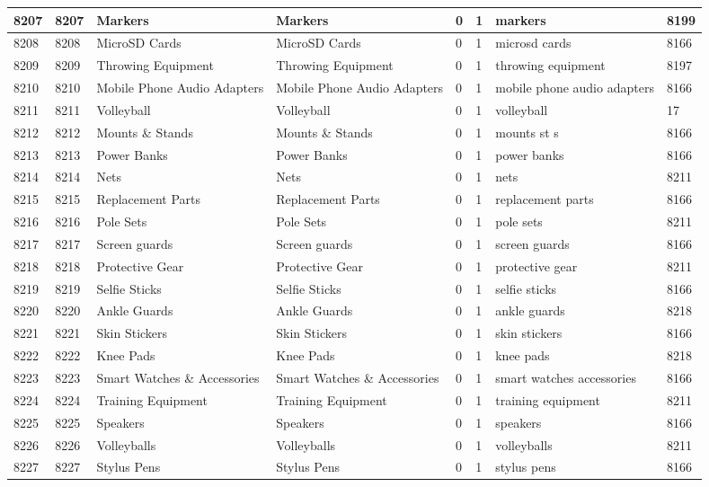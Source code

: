 \begin{longtable}{|l|l|l|l|l|l|l|l|}
8207 & 8207 & Markers & Markers & 0 & 1 & markers & 8199 \\ \hline 
8208 & 8208 & MicroSD Cards & MicroSD Cards & 0 & 1 & microsd cards & 8166 \\ \hline 
8209 & 8209 & Throwing Equipment & Throwing Equipment & 0 & 1 & throwing equipment & 8197 \\ \hline 
8210 & 8210 & Mobile Phone Audio Adapters & Mobile Phone Audio Adapters & 0 & 1 & mobile phone audio adapters & 8166 \\ \hline 
8211 & 8211 & Volleyball & Volleyball & 0 & 1 & volleyball & 17 \\ \hline 
8212 & 8212 & Mounts \& Stands & Mounts \& Stands & 0 & 1 & mounts st s & 8166 \\ \hline 
8213 & 8213 & Power Banks & Power Banks & 0 & 1 & power banks & 8166 \\ \hline 
8214 & 8214 & Nets & Nets & 0 & 1 & nets & 8211 \\ \hline 
8215 & 8215 & Replacement Parts & Replacement Parts & 0 & 1 & replacement parts & 8166 \\ \hline 
8216 & 8216 & Pole Sets & Pole Sets & 0 & 1 & pole sets & 8211 \\ \hline 
8217 & 8217 & Screen guards & Screen guards & 0 & 1 & screen guards & 8166 \\ \hline 
8218 & 8218 & Protective Gear & Protective Gear & 0 & 1 & protective gear & 8211 \\ \hline 
8219 & 8219 & Selfie Sticks & Selfie Sticks & 0 & 1 & selfie sticks & 8166 \\ \hline 
8220 & 8220 & Ankle Guards & Ankle Guards & 0 & 1 & ankle guards & 8218 \\ \hline 
8221 & 8221 & Skin Stickers & Skin Stickers & 0 & 1 & skin stickers & 8166 \\ \hline 
8222 & 8222 & Knee Pads & Knee Pads & 0 & 1 & knee pads & 8218 \\ \hline 
8223 & 8223 & Smart Watches \& Accessories & Smart Watches \& Accessories & 0 & 1 & smart watches accessories & 8166 \\ \hline 
8224 & 8224 & Training Equipment & Training Equipment & 0 & 1 & training equipment & 8211 \\ \hline 
8225 & 8225 & Speakers & Speakers & 0 & 1 & speakers & 8166 \\ \hline 
8226 & 8226 & Volleyballs & Volleyballs & 0 & 1 & volleyballs & 8211 \\ \hline 
8227 & 8227 & Stylus Pens & Stylus Pens & 0 & 1 & stylus pens & 8166 \\ \hline 

\end{longtable}
